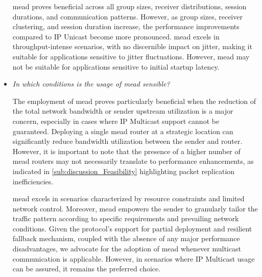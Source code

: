 \begin{itemize}
    \gls{mead} proves beneficial across all group sizes, receiver distributions,
        session durations, and communication patterns.
    However, as group sizes, receiver clustering, and session duration
        increase, the performance improvements compared to IP Unicast become
        more pronounced.
    \gls{mead} excels in throughput-intense scenarios, with no discernible impact
        on jitter, making it suitable for applications sensitive to jitter
        fluctuations.
    However, \gls{mead} may not be suitable for applications sensitive to initial
        startup latency.

\item[\textit{\rqiv{}}]
    \textit{In which conditions is the usage of \gls{mead} sensible?}

    The employment of \gls{mead} proves particularly beneficial when the
        reduction of the total network bandwidth or sender upstream utilization
        is a major concern, especially in cases where IP Multicast support
        cannot be guaranteed.
    Deploying a single \gls{mead} router at a strategic location can
        significantly reduce bandwidth utilization between the sender and
        router.
    However, it is important to note that the presence of a higher number of
        \gls{mead} routers may not necessarily translate to performance
        enhancements, as indicated in \autoref{sub:discussion_Feasibility}
        highlighting packet replication inefficiencies.

    \gls{mead} excels in scenarios characterized by resource constraints and
        limited network control.
    Moreover, \gls{mead} empowers the sender to granularly tailor the traffic
        pattern according to specific requirements and prevailing network
        conditions.
    Given the protocol's support for partial deployment and resilient fallback
        mechanism, coupled with the absence of any major performance
        disadvantages, we advocate for the adoption of \gls{mead} whenever
        multicast communication is applicable.
    However, in scenarios where IP Multicast usage can be assured, it remains
        the preferred choice.

\end{itemize}

